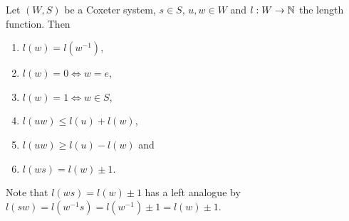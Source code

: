 \begin{lemm}
	Let $(W,S)$ be a Coxeter system, $s \in S$, $u, w \in W$ and $l : W \to \mathbb{N}$ the length function. Then
	\begin{enumerate}
		\item $l(w) = l(w^{-1})$,
		\item $l(w) = 0 \iff w = e$,
		\item $l(w) = 1 \iff w \in S$,
		\item $l(uw) \leq l(u) + l(w)$,
		\item $l(uw) \geq l(u) - l(w)$ and
		\item $l(ws) = l(w) \pm 1$.
	\end{enumerate}
\end{lemm}

\begin{rema}
	Note that $l(ws) = l(w) \pm 1$ has a left analogue by $l(sw) = l(w^{-1} s) = l(w^{-1}) \pm 1 = l(w) \pm 1$.
\end{rema}
